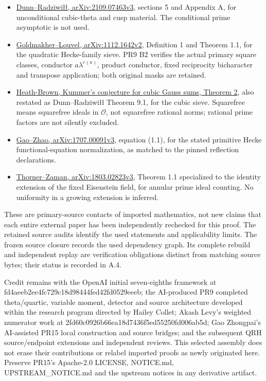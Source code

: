 \documentclass[11pt,a4paper]{article}
\newcommand{\sourcecode}[1]{{\small\ttfamily #1}}
\providecommand{\tightlist}{\setlength{\itemsep}{0pt}\setlength{\parskip}{0pt}}
\begin{document}
\begin{itemize}
\tightlist
\item
  \href{https://arxiv.org/abs/2109.07463v3}{Dunn--Radziwiłł,
  arXiv:2109.07463v3}, sections 5 and Appendix A, for unconditional
  cubic-theta and cusp material. The conditional prime asymptotic is not
  used.
\item
  \href{https://arxiv.org/abs/1112.1642v2}{Goldmakher--Louvel,
  arXiv:1112.1642v2}, Definition 1 and Theorem 1.1, for the quadratic
  Hecke-family sieve. PR9 B2 verifies the actual primary square classes,
  conductor \(a\lambda^{e(a)}\), product conductor, fixed reciprocity
  bicharacter and transpose application; both original masks are
  retained.
\item
  \href{https://doi.org/10.1007/s11856-000-1273-y}{Heath-Brown, Kummer's
  conjecture for cubic Gauss sums, Theorem 2}, also restated as
  Dunn--Radziwiłł Theorem 9.1, for the cubic sieve. Squarefree means
  squarefree ideals in \(\mathcal O\), not squarefree rational norms;
  rational prime factors are not silently excluded.
\item
  \href{https://arxiv.org/abs/1707.00091v3}{Gao--Zhao,
  arXiv:1707.00091v3}, equation (1.1), for the stated primitive Hecke
  functional-equation normalization, as matched to the pinned reflection
  declarations.
\item
  \href{https://arxiv.org/abs/1803.02823v3}{Thorner--Zaman,
  arXiv:1803.02823v3}, Theorem 1.1 specialized to the identity extension
  of the fixed Eisenstein field, for annular prime ideal counting. No
  uniformity in a growing extension is inferred.
\end{itemize}

These are primary-source contacts of imported mathematics, not new
claims that each entire external paper has been independently rechecked
for this proof. The retained source audits identify the used statements
and applicability limits. The frozen source closure records the used
dependency graph. Its complete rebuild and independent replay are
verification obligations distinct from matching source bytes; their
status is recorded in A.4.

Credit remains with the OpenAI initial seven-eighths framework at
\sourcecode{fd4aeeb2\allowbreak{}ee4fc729\allowbreak{}c18d9844\allowbreak{}4fed42fd\allowbreak{}0529eeeb}; the AI-produced PR9 completed
theta/quartic, variable moment, detector and source architecture
developed within the research program directed by Hailey Collet; Akash
Levy's weighted numerator work at
\sourcecode{2fd60c09\allowbreak{}26b66ea1\allowbreak{}8d7436f5\allowbreak{}ed55250f\allowbreak{}d006ab5d}; Gao Zhongpai's AI-assisted
PR15 local construction and source bridges; and the subsequent QRH
source/endpoint extensions and independent reviews. This selected
assembly does not erase their contributions or relabel imported proofs
as newly originated here. Preserve PR15's Apache-2.0 LICENSE, NOTICE.md,
UPSTREAM\_\allowbreak{}NOTICE.md and the upstream notices in any derivative artifact.
\end{document}
